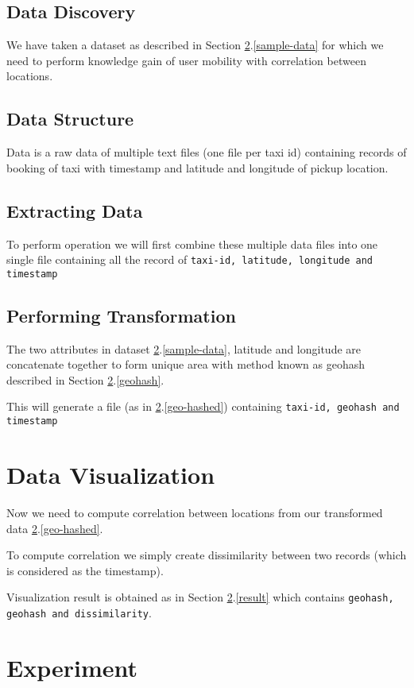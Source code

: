 \documentclass[paper=letter, fontsize=12pt]{article}
\begin{document}
\subsection{Data Discovery}
We have taken a dataset as described in Section \ref{section:experiments}.\ref{sample-data} for which we need to perform knowledge gain of user mobility with correlation between locations.

\subsection{Data Structure}
Data is a raw data of multiple text files (one file per taxi id) containing records of booking of taxi with timestamp and latitude and longitude of pickup location.

\subsection{Extracting Data}
To perform operation we will first combine these multiple data files into one single file containing all the record of \verb|taxi-id, latitude, longitude and timestamp|

\subsection{Performing Transformation}
The two attributes in dataset \ref{section:experiments}.\ref{sample-data}, latitude and longitude are concatenate together to form unique area with method known as geohash described in Section \ref{section:experiments}.\ref{geohash}.

This will generate a file (as in \ref{section:experiments}.\ref{geo-hashed}) containing \verb|taxi-id, geohash and timestamp|

\section{Data Visualization}
Now we need to compute correlation between locations from our transformed data \ref{section:experiments}.\ref{geo-hashed}.

To compute correlation we simply create dissimilarity between two records (which is considered as the timestamp).

Visualization result is obtained as in Section \ref{section:experiments}.\ref{result} which contains \verb|geohash, geohash and dissimilarity|.



\section{Experiment}\label{section:experiments}
\end{document}
